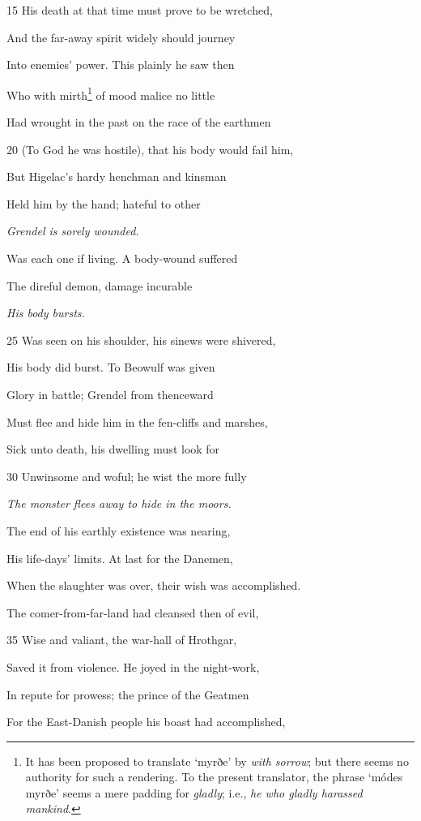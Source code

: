 15
His death at that time must prove to be wretched,

And the far-away spirit widely should journey

Into enemies’ power. This plainly he saw then

Who with mirth\footnote{It has been proposed to translate ‘myrðe’ by \emph{with sorrow}; but there
seems no authority for such a rendering. To the present translator, the phrase
‘módes myrðe’ seems a mere padding for \emph{gladly}; i.e., \emph{he who gladly
harassed mankind}.} of mood malice no little

Had wrought in the past on the race of the earthmen

20
(To God he was hostile), that his body would fail him,

But Higelac’s hardy henchman and kinsman

Held him by the hand; hateful to other

\emph{Grendel is sorely
wounded.}

Was each one if living. A body-wound suffered

The direful demon, damage incurable

\emph{His body bursts.}

25
Was seen on his shoulder, his sinews were shivered,

His body did burst. To Beowulf was given

Glory in battle; Grendel from thenceward

Must flee and hide him in the fen-cliffs and marshes,

Sick unto death, his dwelling must look for

30
Unwinsome and woful; he wist the more fully

\emph{The monster flees
away to hide in
the moors.}

The end of his earthly existence was nearing,

His life-days’ limits. At last for the Danemen,

When the slaughter was over, their wish was accomplished.

The comer-from-far-land had cleansed then of evil,

35
Wise and valiant, the war-hall of Hrothgar,

Saved it from violence. He joyed in the night-work,

In repute for prowess; the prince of the Geatmen

For the East-Danish people his boast had accomplished,

